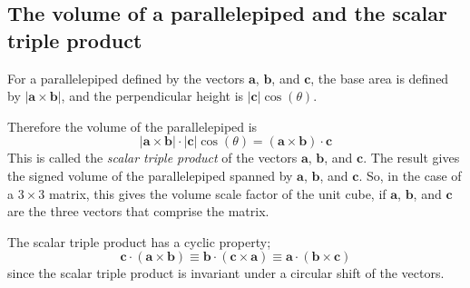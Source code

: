 \documentclass[11pt, a4paper]{article}
\begin{document}
\normalsize
\vspace{0.5cm}


\subsection{The volume of a parallelepiped and the scalar triple product}
\begin{figure}[H]
\centering
{}
\end{figure}
For a parallelepiped defined by the vectors $\boldsymbol{a}$, $\boldsymbol{b}$, and $\boldsymbol{c}$, the base area is defined by $\left|\boldsymbol{a}\times\boldsymbol{b}\right|$, and the perpendicular height is $\left|\boldsymbol{c}\right|\cos(\theta)$. \newline \par

Therefore the volume of the parallelepiped is
\begin{equation*}
\left|\boldsymbol{a}\times\boldsymbol{b}\right|\cdot\left|\boldsymbol{c}\right|\cos(\theta)=(\boldsymbol{a}\times\boldsymbol{b})\cdot\boldsymbol{c}
\end{equation*}
This is called the \emph{scalar triple product} of the vectors $\boldsymbol{a}$, $\boldsymbol{b}$, and $\boldsymbol{c}$. The result gives the signed volume of the parallelepiped spanned by $\boldsymbol{a}$, $\boldsymbol{b}$, and $\boldsymbol{c}$. So, in the case of a $3\times3$ matrix, this gives the volume scale factor of the unit cube, if $\boldsymbol{a}$, $\boldsymbol{b}$, and $\boldsymbol{c}$ are the three vectors that comprise the matrix. \newline \par

The scalar triple product has a cyclic property;
\begin{equation*}
\boldsymbol{c}\cdot(\boldsymbol{a}\times\boldsymbol{b})\equiv\boldsymbol{b}\cdot(\boldsymbol{c}\times\boldsymbol{a})\equiv\boldsymbol{a}\cdot(\boldsymbol{b}\times\boldsymbol{c})
\end{equation*}
since the scalar triple product is invariant under a circular shift of the vectors. \newline\par
\end{document}
